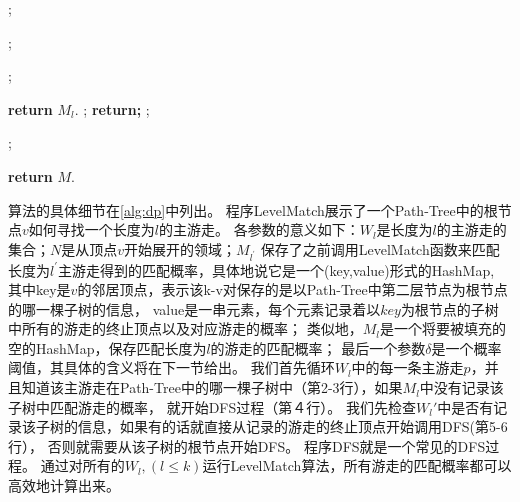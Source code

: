 \documentclass[master]{njuthesis}
\begin{document}
\begin{algorithm}[h]
\label{alg:dp}
\begin{algorithmic}[1]
		;
				
						\State \parbox[t]{\dimexpr\linewidth-\algorithmicindent} {;}	
					\Else 
								\State \parbox[t]{\dimexpr\linewidth-\algorithmicindent}{;}
							\EndFor
						\EndFor
					\EndIf			
				
			\EndFor
	\EndFor
	\State \textbf{return} $M_l$.
\EndProcedure
{}
	;
		\State \textbf{return;} 
	\EndIf
		;   %
	\Else
			\State \parbox[t]{\dimexpr\linewidth-\algorithmicindent} {;}
		\EndFor
	\EndIf
	\State \textbf{return} $M$.
\EndProcedure
\end{algorithmic}
\end{algorithm}
算法的具体细节在\ref{alg:dp}中列出。
程序LevelMatch展示了一个Path-Tree中的根节点$v$如何寻找一个长度为$l$的主游走。
各参数的意义如下：$W_l$是长度为$l$的主游走的集合；$N$是从顶点$v$开始展开的领域；$M_{l^\prime}$ 
保存了之前调用LevelMatch函数来匹配长度为$l^\prime$主游走得到的匹配概率，具体地说它是一个(key,value)形式的HashMap,
其中key是$v$的邻居顶点，表示该k-v对保存的是以Path-Tree中第二层节点为根节点的哪一棵子树的信息，
value是一串元素，每个元素记录着以$key$为根节点的子树中所有的游走的终止顶点以及对应游走的概率；
类似地，$M_l$是一个将要被填充的空的HashMap，保存匹配长度为$l$的游走的匹配概率；
最后一个参数$\delta$是一个概率阈值，其具体的含义将在下一节给出。
我们首先循环$W_l$中的每一条主游走$p$，并且知道该主游走在Path-Tree中的哪一棵子树中（第2-3行），如果$M_l$中没有记录该子树中匹配游走的概率，
就开始DFS过程（第４行）。
我们先检查$W_l{\prime}$中是否有记录该子树的信息，如果有的话就直接从记录的游走的终止顶点开始调用DFS(第5-6行），
否则就需要从该子树的根节点开始DFS。
程序DFS就是一个常见的DFS过程。
通过对所有的$W_l, (l \leq k)$运行LevelMatch算法，所有游走的匹配概率都可以高效地计算出来。
\end{document}
